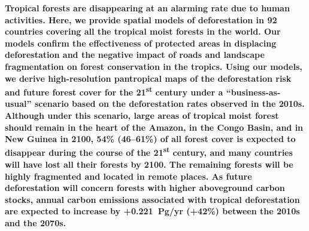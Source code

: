 \documentclass[
  12pt,
]{article}
\begin{document}
\textbf{Tropical forests are disappearing at an alarming rate due to human activities. Here, we provide spatial models of deforestation in 92 countries covering all the tropical moist forests in the world. Our models confirm the effectiveness of protected areas in displacing deforestation and the negative impact of roads and landscape fragmentation on forest conservation in the tropics. Using our models, we derive high-resolution pantropical maps of the deforestation risk and future forest cover for the 21\textsuperscript{st} century under a ``business-as-usual'' scenario based on the deforestation rates observed in the 2010s. Although under this scenario, large areas of tropical moist forest should remain in the heart of the Amazon, in the Congo Basin, and in New Guinea in 2100, 54\% (46--61\%) of all forest cover is expected to disappear during the course of the 21\textsuperscript{st} century, and many countries will have lost all their forests by 2100. The remaining forests will be highly fragmented and located in remote places. As future deforestation will concern forests with higher aboveground carbon stocks, annual carbon emissions associated with tropical deforestation are expected to increase by +0.221~Pg/yr (+42\%) between the 2010s and the 2070s.}\\

% 

\newpage

\end{document}
